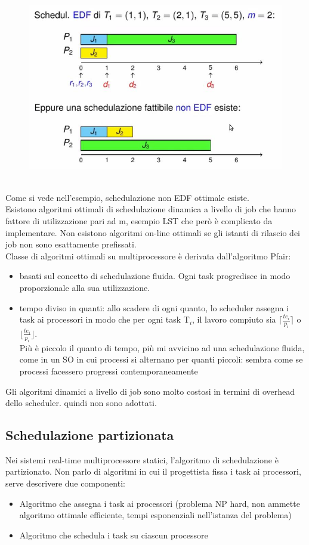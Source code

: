 \documentclass[12pt, oneside]{extbook}
\begin{document}
\begin{figure}[!h]
\centering
\includegraphics[scale=0.4]{immagini/image-042.jpg}
\end{figure}
\\Come si vede nell'esempio, schedulazione non EDF ottimale esiste.\\ Esistono algoritmi ottimali di schedulazione dinamica a livello di job che hanno fattore di utilizzazione pari ad m, esempio LST che però è complicato da implementare. Non esistono algoritmi on-line ottimali se gli istanti di rilascio dei job non sono esattamente prefissati.\\ Classe di algoritmi ottimali su multiprocessore è derivata dall'algoritmo Pfair:
\begin{itemize}
\item basati sul concetto di schedulazione fluida. Ogni task progredisce in modo proporzionale alla sua utilizzazione.
\item tempo diviso in quanti: allo scadere di ogni quanto, lo scheduler assegna i task ai processori in modo che per ogni task T$_{i}$, il lavoro compiuto sia $\lceil \frac{te_i}{p_i}\rceil$ o $\lfloor\frac{te_i}{p_i}\rfloor$.\\ Più è piccolo il quanto di tempo, più mi avvicino ad una schedulazione fluida, come in un SO in cui processi si alternano per quanti piccoli: sembra come se processi facessero progressi contemporaneamente
\end{itemize}
Gli algoritmi dinamici a livello di job sono molto costosi in termini di overhead dello scheduler. quindi non sono adottati.
\subsection{Schedulazione partizionata}
Nei sistemi real-time multiprocessore statici, l'algoritmo di schedulazione è partizionato. Non parlo di algoritmi in cui il progettista fissa i task ai processori, serve descrivere due componenti:
\begin{itemize}
\item Algoritmo che assegna i task ai processori (problema NP hard, non ammette algoritmo ottimale efficiente, tempi esponenziali nell'istanza del problema)
\item Algoritmo che schedula i task su ciascun processore
\end{itemize}
\end{document}

